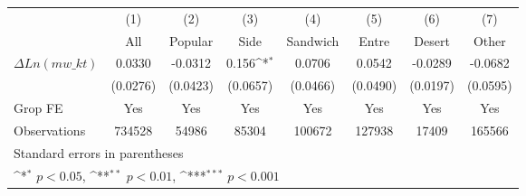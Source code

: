 {
\def\sym#1{\ifmmode^{#1}\else\(^{#1}\)\fi}
\begin{tabular}{l*{7}{c}}
\hline\hline
                    &\multicolumn{1}{c}{(1)}&\multicolumn{1}{c}{(2)}&\multicolumn{1}{c}{(3)}&\multicolumn{1}{c}{(4)}&\multicolumn{1}{c}{(5)}&\multicolumn{1}{c}{(6)}&\multicolumn{1}{c}{(7)}\\
                    &\multicolumn{1}{c}{All}&\multicolumn{1}{c}{Popular}&\multicolumn{1}{c}{Side}&\multicolumn{1}{c}{Sandwich}&\multicolumn{1}{c}{Entre}&\multicolumn{1}{c}{Desert}&\multicolumn{1}{c}{Other}\\
\hline
$ \Delta Ln(mw\_{kt}) $&      0.0330         &     -0.0312         &       0.156\sym{*}  &      0.0706         &      0.0542         &     -0.0289         &     -0.0682         \\
                    &    (0.0276)         &    (0.0423)         &    (0.0657)         &    (0.0466)         &    (0.0490)         &    (0.0197)         &    (0.0595)         \\
\hline
Grop FE        &      Yes         &       Yes         &       Yes         &      Yes         &      Yes         &       Yes         &      Yes         \\

Observations        &      734528         &       54986         &       85304         &      100672         &      127938         &       17409         &      165566         \\
\hline\hline
\multicolumn{8}{l}{\footnotesize Standard errors in parentheses}\\
\multicolumn{8}{l}{\footnotesize \sym{*} \(p<0.05\), \sym{**} \(p<0.01\), \sym{***} \(p<0.001\)}\\
\end{tabular}
}
